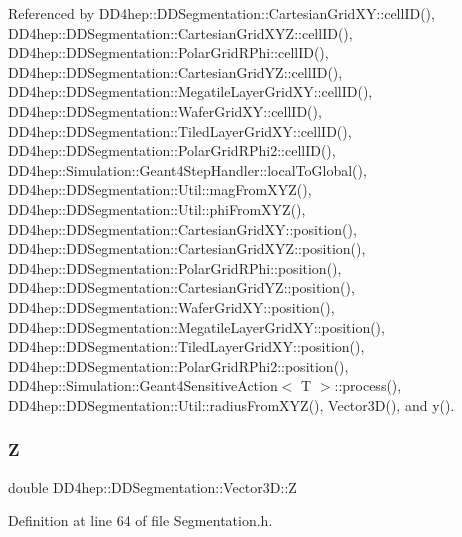 Referenced by D\+D4hep\+::\+D\+D\+Segmentation\+::\+Cartesian\+Grid\+X\+Y\+::cell\+I\+D(), D\+D4hep\+::\+D\+D\+Segmentation\+::\+Cartesian\+Grid\+X\+Y\+Z\+::cell\+I\+D(), D\+D4hep\+::\+D\+D\+Segmentation\+::\+Polar\+Grid\+R\+Phi\+::cell\+I\+D(), D\+D4hep\+::\+D\+D\+Segmentation\+::\+Cartesian\+Grid\+Y\+Z\+::cell\+I\+D(), D\+D4hep\+::\+D\+D\+Segmentation\+::\+Megatile\+Layer\+Grid\+X\+Y\+::cell\+I\+D(), D\+D4hep\+::\+D\+D\+Segmentation\+::\+Wafer\+Grid\+X\+Y\+::cell\+I\+D(), D\+D4hep\+::\+D\+D\+Segmentation\+::\+Tiled\+Layer\+Grid\+X\+Y\+::cell\+I\+D(), D\+D4hep\+::\+D\+D\+Segmentation\+::\+Polar\+Grid\+R\+Phi2\+::cell\+I\+D(), D\+D4hep\+::\+Simulation\+::\+Geant4\+Step\+Handler\+::local\+To\+Global(), D\+D4hep\+::\+D\+D\+Segmentation\+::\+Util\+::mag\+From\+X\+Y\+Z(), D\+D4hep\+::\+D\+D\+Segmentation\+::\+Util\+::phi\+From\+X\+Y\+Z(), D\+D4hep\+::\+D\+D\+Segmentation\+::\+Cartesian\+Grid\+X\+Y\+::position(), D\+D4hep\+::\+D\+D\+Segmentation\+::\+Cartesian\+Grid\+X\+Y\+Z\+::position(), D\+D4hep\+::\+D\+D\+Segmentation\+::\+Polar\+Grid\+R\+Phi\+::position(), D\+D4hep\+::\+D\+D\+Segmentation\+::\+Cartesian\+Grid\+Y\+Z\+::position(), D\+D4hep\+::\+D\+D\+Segmentation\+::\+Wafer\+Grid\+X\+Y\+::position(), D\+D4hep\+::\+D\+D\+Segmentation\+::\+Megatile\+Layer\+Grid\+X\+Y\+::position(), D\+D4hep\+::\+D\+D\+Segmentation\+::\+Tiled\+Layer\+Grid\+X\+Y\+::position(), D\+D4hep\+::\+D\+D\+Segmentation\+::\+Polar\+Grid\+R\+Phi2\+::position(), D\+D4hep\+::\+Simulation\+::\+Geant4\+Sensitive\+Action$<$ T $>$\+::process(), D\+D4hep\+::\+D\+D\+Segmentation\+::\+Util\+::radius\+From\+X\+Y\+Z(), Vector3\+D(), and y().

\hypertarget{struct_d_d4hep_1_1_d_d_segmentation_1_1_vector3_d_a80100f70c9d120e5a5f6abd1fcbac26f}{}\label{struct_d_d4hep_1_1_d_d_segmentation_1_1_vector3_d_a80100f70c9d120e5a5f6abd1fcbac26f} 
\subsubsection{\texorpdfstring{Z}{Z}}
{\footnotesize\ttfamily double D\+D4hep\+::\+D\+D\+Segmentation\+::\+Vector3\+D\+::Z}



Definition at line 64 of file Segmentation.\+h.



